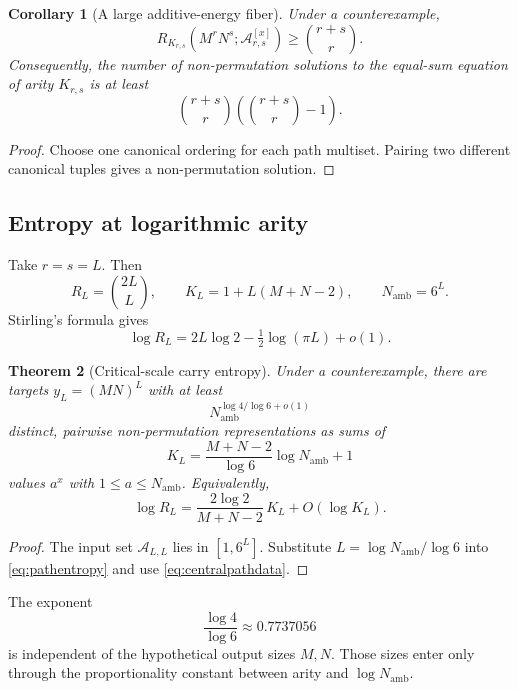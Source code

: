 \documentclass[11pt,oneside]{article}
\newtheorem{theorem}{Theorem}[section]
\newtheorem{corollary}[theorem]{Corollary}
\theoremstyle{definition}
\newcommand{\cA}{\mathscr{A}}
\begin{document}
\begin{corollary}[A large additive-energy fiber]\label{cor:energyfiber}
Under a counterexample,
\[
 R_{K_{r,s}}\!\left(M^rN^s;\cA_{r,s}^{[x]}\right)
       \ge\binom{r+s}{r}.
\]
Consequently, the number of non-permutation solutions to the equal-sum equation of arity $K_{r,s}$ is at least
\[
       \binom{r+s}{r}
       \left(\binom{r+s}{r}-1\right).
\]
\end{corollary}

\begin{proof}
Choose one canonical ordering for each path multiset.  Pairing two different canonical tuples gives a non-permutation solution.
\end{proof}

\subsection{Entropy at logarithmic arity}

Take $r=s=L$.  Then
\begin{equation}\label{eq:centralpathdata}
  R_L=\binom{2L}{L},\qquad
  K_L=1+L(M+N-2),\qquad
  N_{\mathrm{amb}}=6^L.
\end{equation}
Stirling's formula gives
\begin{equation}\label{eq:pathentropy}
  \log R_L=2L\log2-\tfrac12\log(\pi L)+o(1).
\end{equation}

\begin{theorem}[Critical-scale carry entropy]\label{thm:carryentropy}
Under a counterexample, there are targets $y_L=(MN)^L$ with at least
\[
       N_{\mathrm{amb}}^{\log4/\log6+o(1)}
\]
distinct, pairwise non-permutation representations as sums of
\[
       K_L=\frac{M+N-2}{\log6}\log N_{\mathrm{amb}}+1
\]
values $a^x$ with $1\le a\le N_{\mathrm{amb}}$.  Equivalently,
\[
     \log R_L
     =\frac{2\log2}{M+N-2}\,K_L+O(\log K_L).
\]
\end{theorem}

\begin{proof}
The input set $\cA_{L,L}$ lies in $[1,6^L]$.  Substitute
$L=\log N_{\mathrm{amb}}/\log6$ into \eqref{eq:pathentropy} and use \eqref{eq:centralpathdata}.
\end{proof}

The exponent
\[
       \frac{\log4}{\log6}\approx0.7737056
\]
is independent of the hypothetical output sizes $M,N$.  Those sizes enter only through the proportionality constant between arity and $\log N_{\mathrm{amb}}$.
\end{document}

